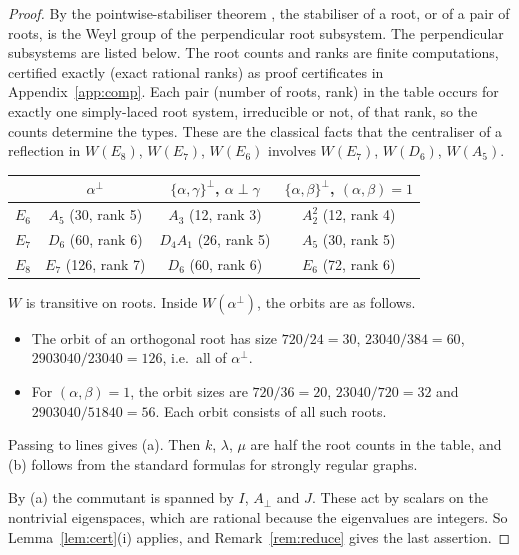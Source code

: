 \documentclass[11pt]{article}
\theoremstyle{definition}
\begin{document}
\begin{proof}
By the pointwise-stabiliser theorem \cite[Thm.~1.12(c),(d), pp.~22--23]{Hum90}, the stabiliser of a root, or of a pair of roots, is the Weyl group of the
perpendicular root subsystem. The perpendicular subsystems are listed below. The root counts and ranks are
finite computations, certified exactly (exact rational ranks) as proof certificates in Appendix~\ref{app:comp}. Each pair (number of roots, rank) in the table occurs for exactly one
simply-laced root system, irreducible or not, of that rank, so the counts determine the types. These are the
classical facts that the centraliser of a reflection in $W(E_8)$, $W(E_7)$, $W(E_6)$ involves $W(E_7)$, $W(D_6)$,
$W(A_5)$.

\begin{center}\small
\begin{tabular}{lccc}
\toprule
 & $\alpha^\perp$ & $\{\alpha,\gamma\}^\perp$, $\alpha\perp\gamma$ & $\{\alpha,\beta\}^\perp$, $(\alpha,\beta)=1$\\
\midrule
$E_6$ & $A_5$ (30, rank 5) & $A_3$ (12, rank 3) & $A_2^2$ (12, rank 4)\\
$E_7$ & $D_6$ (60, rank 6) & $D_4A_1$ (26, rank 5) & $A_5$ (30, rank 5)\\
$E_8$ & $E_7$ (126, rank 7) & $D_6$ (60, rank 6) & $E_6$ (72, rank 6)\\
\bottomrule
\end{tabular}
\end{center}

$W$ is transitive on roots. Inside $W(\alpha^\perp)$, the orbits are as follows.
\begin{itemize}
\item The orbit of an orthogonal root has size $720/24=30$, $23040/384=60$, $2903040/23040=126$, i.e.\ all of
$\alpha^\perp$.
\item For $(\alpha,\beta)=1$, the orbit sizes are $720/36=20$, $23040/720=32$ and
$2903040/51840=56$. Each orbit consists of all such roots.
\end{itemize}
Passing to lines gives (a). Then $k$, $\lambda$, $\mu$ are half the root counts in the table, and (b) follows from
the standard formulas for strongly regular graphs.

By (a) the commutant is spanned by $I$, $A_\perp$ and $J$. These act by scalars on the nontrivial eigenspaces,
which are rational because the eigenvalues are integers. So Lemma~\ref{lem:cert}(i) applies, and
Remark~\ref{rem:reduce} gives the last assertion.
\end{proof}
\end{document}
